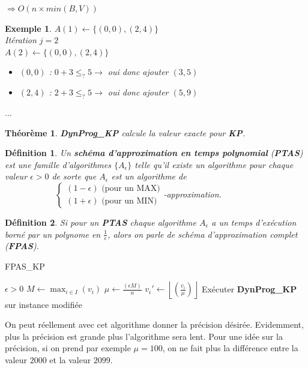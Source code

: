 \documentclass[12pt]{article}
\newcommand{\titre}[1]{\textcolor{title}{#1}}
\newcommand{\cdil}[1]{\left\lfloor #1 \right\rfloor}
\newtheorem{de}{D\'efinition}[section]
\newtheorem{exemple}{Exemple}[section]
\newtheorem{thm}{Th\'eor\`eme}[section]
\begin{document}
$\Longrightarrow O(n\times min(B,V))$

\begin{exemple}
\noindent $A(1) \leftarrow \{(0,0),(2,4)\}$ \\
Itération $j = 2$ \\
\indent $A(2) \leftarrow \{(0,0),(2,4)\}$
\indent \begin{itemize}
\item $(0,0)$ : $0+3 \leq_? 5 \rightarrow$ oui donc ajouter $(3,5)$
\item $(2,4)$ : $2+3 \leq_? 5 \rightarrow$ oui donc ajouter $(5,9)$
\end{itemize}
$\ldots$
\end{exemple}

\begin{thm}
\textbf{DynProg\_KP} calcule la valeur exacte pour \textbf{\titre{KP}}.
\end{thm}

\begin{de}
Un \textbf{schéma d'approximation en temps polynomial} (\textbf{PTAS}) est une famille d'algorithmes $\{A_\epsilon\}$ telle qu'il existe un
algorithme pour chaque valeur $\epsilon > 0$ de sorte que $A_\epsilon$ est un algorithme de \\ \indent $\qquad\qquad\qquad \left\{
\begin{array}{c}
(1-\epsilon) \text{ (pour un MAX)}\\
(1+\epsilon) \text{ (pour un MIN)}
\end{array}\right.$-approximation.
\end{de}

\begin{de}
Si pour un \textbf{PTAS} chaque algorithme $A_\epsilon$ a un temps d'exécution borné par un polynome en $\frac{1}{\epsilon}$, alors on parle
de schéma d'approximation complet (\textbf{FPAS}).
\end{de}

\begin{algorithm}[h!]
\caption{FPAS\_KP}
\begin{algorithmic}[1]
\REQUIRE $\epsilon > 0$
\STATE $M \leftarrow \max_{i\in I}(v_i)$
\STATE $\mu \leftarrow \frac{(\epsilon M)}{n}$
\STATE $v_i' \leftarrow \cdil{(\frac{v_i}{\mu})}$
\ENDFOR
\STATE Exécuter \textbf{DynProg\_KP} sur instance modifiée
\end{algorithmic}
\end{algorithm}

On peut réellement avec cet algorithme donner la précision désirée. Evidemment, plus la précision est grande plus l'algorithme sera lent.
Pour une idée sur la précision, si on prend par exemple $\mu = 100$, on ne fait plus la différence entre la valeur $2000$ et la valeur
$2099$.\\
$ $\\$ $\\$ $\\
\end{document}

